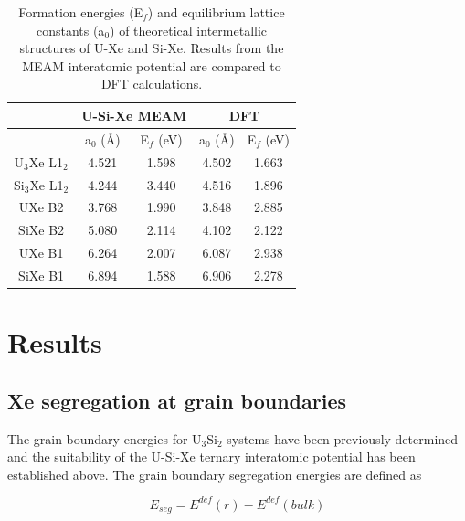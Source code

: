 \documentclass[review]{elsarticle}
\begin{document}
\begin{table}[h]
\caption{Formation energies (E$_f$) and equilibrium lattice constants (a$_0$) of theoretical intermetallic structures of U-Xe and Si-Xe. Results from the MEAM interatomic potential are compared to DFT calculations. }\label{tab:inter}
\begin{center}
\begin{tabular}{|c|cc|cc|}
 \hline
 & \multicolumn{2}{c|}{U-Si-Xe MEAM} & \multicolumn{2}{c|}{DFT} \\
 \hline
 & a$_0$ (\AA) & E$_f$ (eV) & a$_0$ (\AA) & E$_f$ (eV) \\ 
 \hline
 U$_3$Xe L1$_2$ & 4.521 & 1.598 & 4.502 & 1.663 \\ 
 Si$_3$Xe L1$_2$ & 4.244 & 3.440 & 4.516 & 1.896 \\ 
 UXe B2 & 3.768 & 1.990 & 3.848 & 2.885 \\ 
 SiXe B2 & 5.080 & 2.114 & 4.102 & 2.122 \\ 
 UXe B1 & 6.264 & 2.007 & 6.087 & 2.938 \\ 
 SiXe B1 & 6.894 & 1.588 & 6.906 & 2.278 \\ 
 \hline
\end{tabular}
\end{center}
\label{default}
\end{table}%

\FloatBarrier

\section{Results}

\subsection{Xe segregation at grain boundaries}

The grain boundary energies for U$_3$Si$_2$ systems have been previously determined \cite{beeler_usi_gb} and the suitability of the U-Si-Xe ternary interatomic potential has been established above. The grain boundary segregation energies are defined as 

\begin{equation}
\label{eq:eseg}
E_{seg} = E^{def}(r) - E^{def}(bulk) 
\end{equation}
\end{document}
